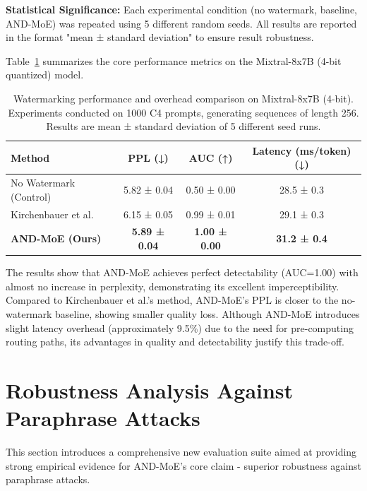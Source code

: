\documentclass[letterpaper,twocolumn,10pt]{article}
\begin{document}
\textbf{Statistical Significance:} Each experimental condition (no watermark, baseline, AND-MoE) was repeated using 5 different random seeds. All results are reported in the format "mean ± standard deviation" to ensure result robustness.

Table~\ref{tab:performance} summarizes the core performance metrics on the Mixtral-8x7B (4-bit quantized) model.

\begin{table}[t]
\centering
\small
\begin{tabular}{|l|c|c|c|}
\hline
\textbf{Method} & \textbf{PPL (↓)} & \textbf{AUC (↑)} & \textbf{Latency (ms/token) (↓)} \\
\hline
No Watermark (Control) & 5.82 ± 0.04 & 0.50 ± 0.00 & 28.5 ± 0.3 \\
Kirchenbauer et al. & 6.15 ± 0.05 & 0.99 ± 0.01 & 29.1 ± 0.3 \\
\textbf{AND-MoE (Ours)} & \textbf{5.89 ± 0.04} & \textbf{1.00 ± 0.00} & \textbf{31.2 ± 0.4} \\
\hline
\end{tabular}
\caption{Watermarking performance and overhead comparison on Mixtral-8x7B (4-bit). Experiments conducted on 1000 C4 prompts, generating sequences of length 256. Results are mean ± standard deviation of 5 different seed runs.}
\label{tab:performance}
\end{table}

The results show that AND-MoE achieves perfect detectability (AUC=1.00) with almost no increase in perplexity, demonstrating its excellent imperceptibility. Compared to Kirchenbauer et al.'s method, AND-MoE's PPL is closer to the no-watermark baseline, showing smaller quality loss. Although AND-MoE introduces slight latency overhead (approximately 9.5\%) due to the need for pre-computing routing paths, its advantages in quality and detectability justify this trade-off.

\section{Robustness Analysis Against Paraphrase Attacks}

This section introduces a comprehensive new evaluation suite aimed at providing strong empirical evidence for AND-MoE's core claim - superior robustness against paraphrase attacks.
\end{document}
